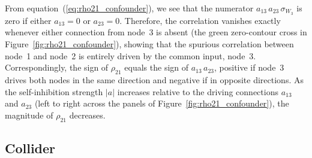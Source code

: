 \documentclass[12pt]{article}
\begin{document}
\addtocounter{figure}{-1}
\label{fig:rho21_confounder}

\vspace{6pt}
From equation~(\ref{eq:rho21_confounder}), we see that the numerator $a_{13}\,a_{23}\,\sigma_{W_3}$ is zero if either $a_{13}=0$ or $a_{23}=0$. Therefore, the
correlation vanishes exactly whenever either connection from
node~3 is absent (the green zero-contour cross in
Figure~\ref{fig:rho21_confounder}), showing that the spurious correlation between node~1 and node~2 is
entirely driven by the common input, node~3. Correspondingly, the
sign of $\rho_{21}$ equals the sign of $a_{13}\,a_{23}$,
positive if node~3 drives both nodes in the same direction
and negative if in opposite directions.
As the self-inhibition strength $|a|$ increases relative to
the driving connections $a_{13}$ and $a_{23}$ (left to right
across the panels of Figure~\ref{fig:rho21_confounder}), the
magnitude of $\rho_{21}$ decreases.

\subsection*{Collider}
\end{document}
